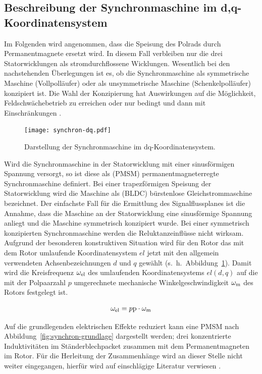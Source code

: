 \subsection{Beschreibung der Synchronmaschine im d,q-Koordinatensystem}\label{sec:synchron-dq}

Im Folgenden wird angenommen, dass die Speisung des Polrads durch Permanentmagnete ersetzt wird.
In diesem Fall verbleiben nur die drei Statorwicklungen als stromdurchflossene Wicklungen.
Wesentlich bei den nachstehenden Überlegungen ist es, ob die Synchronmaschine als symmetrische Maschine (Vollpolläufer) oder als unsymmetrische Maschine (Schenkelpolläufer) konzipiert ist.
Die Wahl der Konzipierung hat Auswirkungen auf die Möglichkeit, Feldschwächebetrieb zu erreichen oder nur bedingt und dann mit Einschränkungen \autocite[S.~291]{schroder2000}.

\begin{figure}[!htb]
\centering
\texttt{[image: synchron-dq.pdf]}
\label{fig:synchron-dq}
\caption{Darstellung der Synchronmaschine im dq-Koordinatensystem.}
\end{figure}

Wird die Synchronmaschine in der Statorwicklung mit einer sinusförmigen Spannung versorgt, so ist diese als (PMSM) permanentmagneterregte Synchronmaschine definiert.
Bei einer trapezförmigen Speisung der Statorwicklung wird die Maschine als (BLDC) bürstenlose Gleichstrommaschine bezeichnet.
Der einfachste Fall für die Ermittlung des Signalflussplanes ist die Annahme, dass die Maschine an der Statorwicklung eine sinusförmige Spannung anliegt und die Maschine symmetrisch konzipiert wurde.
Bei einer symmetrisch konzipierten Synchronmaschine werden die Reluktanzeinflüsse nicht wirksam.
Aufgrund der besonderen konstruktiven Situation wird für den Rotor das mit dem Rotor umlaufende Koordinatensystem $el$ jetzt mit den allgemein verwendeten Achsenbezeichnungen $d$ und $q$ gewählt (s.~h.~Abbildung~\ref{fig:synchron-dq}).
Damit wird die Kreisfrequenz $\omega_{\mathrm{el}}$ des umlaufenden Koordinatensystems $el(d, q)$ auf die mit der Polpaarzahl $p$ umgerechnete mechanische Winkelgeschwindigkeit $\omega_{\mathrm{m}}$ des Rotors festgelegt ist.

\begin{align}
\omega_{\mathrm{el}} = p\mathrm{p}\cdot\omega_{\mathrm{m}}
\end{align}

Auf die grundlegenden elektrischen Effekte reduziert kann eine PMSM nach Abbildung~\ref{fig:synchron-grundlage} dargestellt werden; drei konzentrierte Induktivitäten im Ständerblechpacket zusammen mit dem Permanentmagneten im Rotor.
Für die Herleitung der Zusammenhänge wird an dieser Stelle nicht weiter eingegangen, hierfür wird auf einschlägige Literatur verwiesen \autocites{mullerI2005}{fischer2009}{schroder2000}{kremser2004}.

